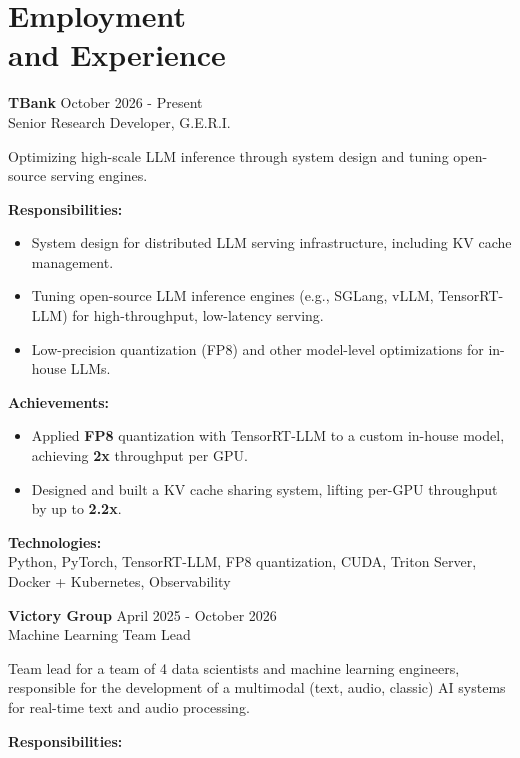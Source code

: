 \section{\sc Employment \\and Experience}
\vspace{2.6pt}

\textbf{TBank} \hfill October 2026 - Present \\
Senior Research Developer, G.E.R.I.

Optimizing high-scale LLM inference through system design and tuning open-source serving engines.

\textbf{Responsibilities:}

\begin{itemize}[left=0pt, label={--}]
    \item System design for distributed LLM serving infrastructure, including KV cache management.
    \item Tuning open-source LLM inference engines (e.g., SGLang, vLLM, TensorRT-LLM) for high-throughput, low-latency serving.
    \item Low-precision quantization (FP8) and other model-level optimizations for in-house LLMs.
\end{itemize}

\textbf{Achievements:}

\begin{itemize}[left=0pt, label={--}]
    \item Applied \textbf{FP8} quantization with TensorRT-LLM to a custom in-house model, achieving \textbf{2x} throughput per GPU.
    \item Designed and built a KV cache sharing system, lifting per-GPU throughput by up to \textbf{2.2x}.
\end{itemize}

\textbf{Technologies:} \\
Python, PyTorch, TensorRT-LLM, FP8 quantization, CUDA, Triton Server, Docker + Kubernetes, Observability

\newpage

\textbf{Victory Group} \hfill April 2025 - October 2026 \\
Machine Learning Team Lead

Team lead for a team of 4 data scientists and machine learning engineers, responsible for the development of a multimodal (text, audio, classic) AI systems for real-time text and audio processing.

\textbf{Responsibilities:}

